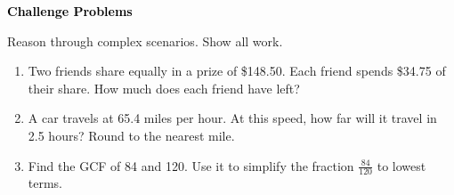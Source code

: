 \documentclass[12pt, letterpaper, fleql]{article}
\begin{document}
\newpage

\begin{tcolorbox}[colback=black!10]
\large\textcolor{black}{\textbf{Challenge Problems}}
\end{tcolorbox}

\noindent
Reason through complex scenarios. Show all work.

\vspace{3mm}
\begin{enumerate}[itemsep=2.4cm, leftmargin=0.6cm]
\item Two friends share equally in a prize of \$148.50. Each friend spends \$34.75 of their share. How much does each friend have left?

\vspace{2.3cm}

\item A car travels at 65.4 miles per hour. At this speed, how far will it travel in 2.5 hours? Round to the nearest mile.

\vspace{2.3cm}

\item Find the GCF of 84 and 120. Use it to simplify the fraction $\frac{84}{120}$ to lowest terms.

\vspace{2.5cm}

\end{enumerate}
\end{document}
